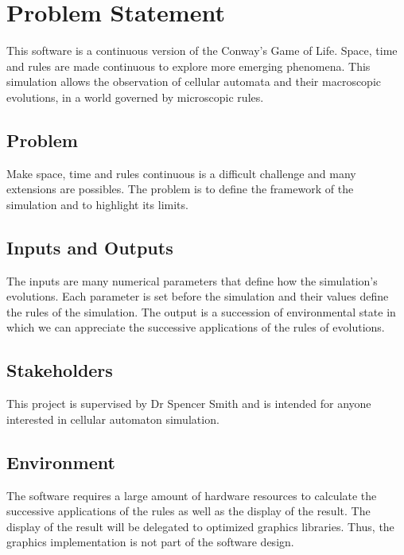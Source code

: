 \documentclass{article}
\title{\progname}
\author{\authname}
\date{01/19/2025}
\begin{document}
\maketitle

\section{Problem Statement}

This software is a continuous version of the Conway's Game of Life.
Space, time and rules are made continuous to explore more emerging phenomena.
This simulation allows the observation of cellular automata and their macroscopic evolutions, in a world governed by microscopic rules.
\subsection{Problem}

Make space, time and rules continuous is a difficult challenge and many extensions are possibles.
The problem is to define the framework of the simulation and to highlight its limits.

\subsection{Inputs and Outputs}

The inputs are many numerical parameters that define how the simulation's evolutions. Each parameter is set before the simulation and their values define the rules of the simulation.
The output is a succession of environmental state in which we can appreciate the successive applications of the rules of evolutions.

\subsection{Stakeholders}

This project is supervised by Dr Spencer Smith and is intended for anyone interested in cellular automaton simulation.

\subsection{Environment}

The software requires a large amount of hardware resources to calculate the successive applications of the rules as well as the display of the result.
The display of the result will be delegated to optimized graphics libraries. Thus, the graphics implementation is not part of the software design. 
\end{document}
